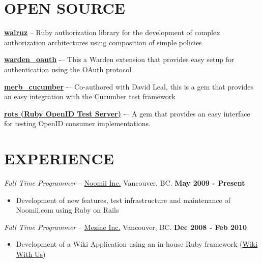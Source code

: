 \documentclass[line,margin]{res}
\begin{document}
\begin{resume}
\section{OPEN SOURCE}
  \begin{list}{\leftmargin=1em}
    \setlength{\itemsep=30em}
    \item \textbf{\href{http://www.github.com/roman/walruz}{walruz}} -- Ruby authorization library for the 
    development of complex authorization architectures using composition of simple policies
    \item \textbf{\href{http://github.com/roman/warden\_oauth}{warden\_oauth}} -– This a Warden extension that 
    provides easy setup for authentication using the OAuth protocol
    \item \textbf{\href{http://github.com/roman/merb\_cucucmber}{merb\_cucumber}} -– Co-authored with David Leal, 
    this is a gem that provides an easy integration with the Cucumber test framework
    \item \textbf{\href{http://github.com/roman/rots}{rots (Ruby OpenID Test Server)}} -– A gem that provides 
    an easy interface for testing OpenID consumer implementations.
  \end{list}

\section{EXPERIENCE} 
  {\sl Full Time Programmer} -- \href{http://www.noomii.com}{Noomii Inc.} Vancouver, BC. \hfill \textbf{May 2009 - Present} \\
  \begin{itemize}
    \item Development of new features, test infrastructure and maintenance of Noomii.com using Ruby on Rails
  \end{itemize}

  {\sl Full Time Programmer} -- \href{http://www.mezine.com}{Mezine Inc.} Vancouver, BC. \hfill \textbf{Dec 2008 - Feb 2010} \\
  \begin{itemize}
    \item Development of a Wiki Application using an in-house Ruby framework (\href{http://wiki.with.us}{Wiki With Us})
  \end{itemize}


\end{resume}
\end{document}
